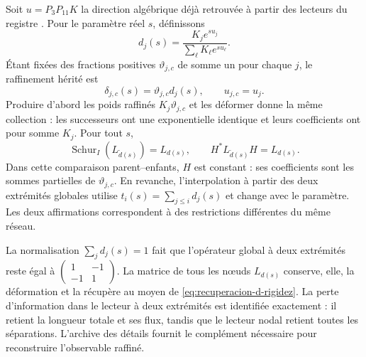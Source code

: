 Soit \(u=P_3P_{11}K\) la direction algébrique déjà retrouvée à partir des
lecteurs du registre \cite{hmtX}. Pour le paramètre réel \(s\), définissons
\[
 d_j(s)=\frac{K_je^{su_j}}{\sum_\ell K_\ell e^{su_\ell}}.
\]
Étant fixées des fractions positives \(\vartheta_{j,c}\) de somme un pour chaque
\(j\), le raffinement hérité est
\[
 \delta_{j,c}(s)=\vartheta_{j,c}d_j(s),\qquad
 u_{j,c}=u_j.
\]
Produire d'abord les poids raffinés \(K_j\vartheta_{j,c}\) et les déformer donne la même collection : les successeurs ont une exponentielle identique et leurs coefficients ont pour somme \(K_j\). Pour tout \(s\),
\begin{equation}
 \operatorname{Schur}_{I}(L_{\widetilde d(s)})=L_{d(s)},
 \qquad H^*L_{\widetilde d(s)}H=L_{d(s)}.
 \label{eq:schur-flujo-k}
\end{equation}
Dans cette comparaison parent--enfants, \(H\) est constant : ses coefficients
sont les sommes partielles de \(\vartheta_{j,c}\). En revanche,
l’interpolation à partir des deux extrémités globales utilise
\(t_i(s)=\sum_{j\le i}d_j(s)\) et change avec le paramètre. Les deux
affirmations correspondent à des restrictions différentes du même réseau.

La normalisation \(\sum_jd_j(s)=1\) fait que l'opérateur global à deux extrémités reste égal à \(\left(\begin{smallmatrix}1&-1\\-1&1\end{smallmatrix}\right)\). La matrice de tous les nœuds \(L_{d(s)}\) conserve, elle, la déformation et la récupère au moyen de \eqref{eq:recuperacion-d-rigidez}. La perte d'information dans le lecteur à deux extrémités est identifiée exactement : il retient la longueur totale et ses flux, tandis que le lecteur nodal retient toutes les séparations. L'archive des détails fournit le complément nécessaire pour reconstruire l'observable raffiné.
